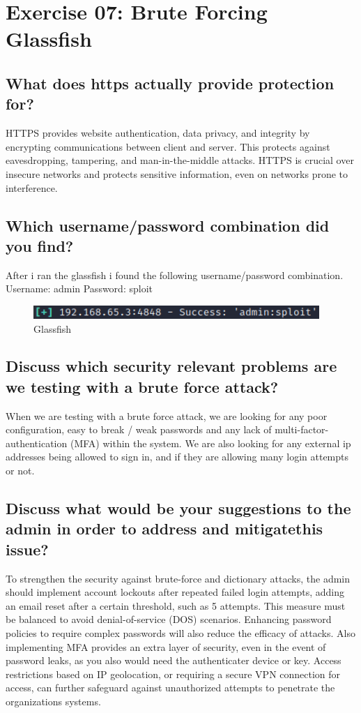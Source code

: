 \section{Exercise 07: Brute Forcing Glassfish}

\subsection{What does https actually provide protection for?}
HTTPS provides website authentication, data privacy, and integrity by encrypting communications between client and server.
This protects against eavesdropping, tampering, and man-in-the-middle attacks.
HTTPS is crucial over insecure networks and protects sensitive information, even on networks prone to interference.

\subsection{Which username/password combination did you find?}
After i ran the glassfish i found the following username/password combination. Username: admin Password: sploit

\begin{figure}[H]
    \centering
    \includegraphics[width=0.7\linewidth]{pic/glassfish.png}
    \caption{Glassfish}
    \label{fig:glassfish}
\end{figure}

\subsection{Discuss which security relevant problems are we testing with a brute force attack?}
When we are testing with a brute force attack, we are looking for any poor configuration, easy to break / weak passwords and any lack of multi-factor-authentication (MFA)
within the system. We are also looking for any external ip addresses being allowed to sign in, and if they are allowing many login attempts or not.



\subsection{Discuss what would be your suggestions to the admin in order to address and mitigatethis issue?}
To strengthen the security against brute-force and dictionary attacks, the admin should implement account lockouts after repeated failed login attempts,
adding an email reset after a certain threshold, such as 5 attempts. This measure must be balanced to avoid denial-of-service (DOS) scenarios.
Enhancing password policies to require complex passwords will also reduce the efficacy of attacks. Also
implementing MFA provides an extra layer of security, even in the event of password leaks, as you also would need the authenticater device or key.
Access restrictions based on IP geolocation, or requiring a secure VPN connection for access, can further safeguard against unauthorized attempts to penetrate the organizations
systems.

